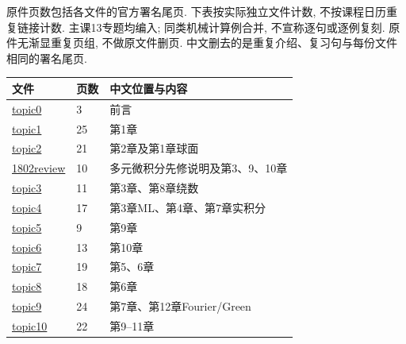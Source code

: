 原件页数包括各文件的官方署名尾页. 下表按实际独立文件计数, 不按课程日历重复链接计数. 主课13专题均编入; 同类机械计算例合并, 不宣称逐句或逐例复刻. 原件无渐显重复页组, 不做原文件删页. 中文删去的是重复介绍、复习句与每份文件相同的署名尾页.
\begin{longtable}{p{}p{}p{}}
\toprule 文件 & 页数 & 中文位置与内容\\\midrule\endhead
\href{https://ocw.mit.edu/courses/18-04-complex-variables-with-applications-spring-2018/resources/mit18_04s18_topic0/}{topic0} & 3 & 前言\\
\href{https://ocw.mit.edu/courses/18-04-complex-variables-with-applications-spring-2018/resources/mit18_04s18_topic1/}{topic1} & 25 & 第1章\\
\href{https://ocw.mit.edu/courses/18-04-complex-variables-with-applications-spring-2018/resources/mit18_04s18_topic2/}{topic2} & 21 & 第2章及第1章球面\\
\href{https://ocw.mit.edu/courses/18-04-complex-variables-with-applications-spring-2018/resources/mit18_04s18_1802review/}{1802review} & 10 & 多元微积分先修说明及第3、9、10章\\
\href{https://ocw.mit.edu/courses/18-04-complex-variables-with-applications-spring-2018/resources/mit18_04s18_topic3/}{topic3} & 11 & 第3章、第8章绕数\\
\href{https://ocw.mit.edu/courses/18-04-complex-variables-with-applications-spring-2018/resources/mit18_04s18_topic4/}{topic4} & 17 & 第3章ML、第4章、第7章实积分\\
\href{https://ocw.mit.edu/courses/18-04-complex-variables-with-applications-spring-2018/resources/mit18_04s18_topic5/}{topic5} & 9 & 第9章\\
\href{https://ocw.mit.edu/courses/18-04-complex-variables-with-applications-spring-2018/resources/mit18_04s18_topic6/}{topic6} & 13 & 第10章\\
\href{https://ocw.mit.edu/courses/18-04-complex-variables-with-applications-spring-2018/resources/mit18_04s18_topic7/}{topic7} & 19 & 第5、6章\\
\href{https://ocw.mit.edu/courses/18-04-complex-variables-with-applications-spring-2018/resources/mit18_04s18_topic8/}{topic8} & 18 & 第6章\\
\href{https://ocw.mit.edu/courses/18-04-complex-variables-with-applications-spring-2018/resources/mit18_04s18_topic9/}{topic9} & 24 & 第7章、第12章Fourier/Green\\
\href{https://ocw.mit.edu/courses/18-04-complex-variables-with-applications-spring-2018/resources/mit18_04s18_topic10/}{topic10} & 22 & 第9--11章\\

\end{longtable}
